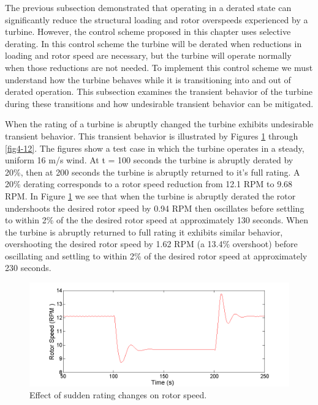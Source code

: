 The previous subsection demonstrated that operating in a derated state can significantly reduce the structural loading and rotor overspeeds experienced by a turbine. However, the control scheme proposed in this chapter uses selective derating. In this control scheme the turbine will be derated when reductions in loading and rotor speed are necessary, but the turbine will operate normally when those reductions are not needed. To implement this control scheme we must understand how the turbine behaves while it is transitioning into and out of derated operation. This subsection examines the transient behavior of the turbine during these transitions and how undesirable transient behavior can be mitigated.

 When the rating of a turbine is abruptly changed the turbine exhibits undesirable transient behavior. This transient behavior is illustrated by Figures \ref{fig4-10} through \ref{fig4-12}. The figures show a test case in which the turbine operates in a steady, uniform 16 m/s wind. At t = 100 seconds the turbine is abruptly derated by 20\%, then at 200 seconds the turbine is abruptly returned to it's full rating. A 20\% derating corresponds to a rotor speed reduction from 12.1 RPM to 9.68 RPM. In Figure \ref{fig4-10} we see that when the turbine is abruptly derated the rotor undershoots the desired rotor speed by 0.94 RPM then oscillates before settling to within 2\% of the the desired rotor speed at approximately 130 seconds. When the turbine is abruptly returned to full rating it exhibits similar behavior, overshooting the desired rotor speed by 1.62 RPM (a 13.4\% overshoot) before oscillating and settling to within 2\% of the desired rotor speed at approximately 230 seconds. 

\begin{figure}[htb]
	\centering
		\includegraphics[width = \linewidth]{Figures/ch4Figures/fig4-10.png}
		
	\caption{Effect of sudden rating changes on rotor speed.}
	\label{fig4-10}
\end{figure}

